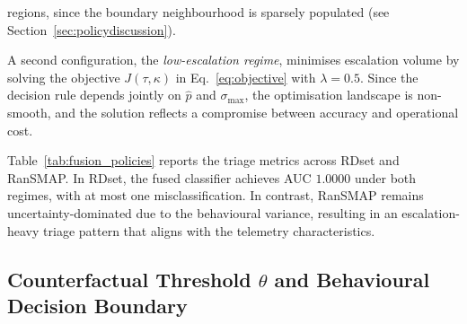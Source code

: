 \documentclass[lettersize,journal]{IEEEtran}
\begin{document}
\cbstart
regions, since the boundary neighbourhood is sparsely populated (see Section~\ref{sec:policydiscussion}).
\cbend


A second configuration, the \emph{low-escalation regime}, minimises escalation volume by
solving the objective $J(\tau,\kappa)$ in Eq.~\eqref{eq:objective} with \(\lambda = 0.5\).
Since the decision rule depends jointly on \(\hat{p}\) and \(\sigma_{\max}\), the optimisation
landscape is non-smooth, and the solution reflects a compromise between accuracy and operational
cost.

Table~\ref{tab:fusion_policies} reports the triage metrics across RDset and RanSMAP. In RDset, the fused classifier achieves AUC \(1.0000\) under both regimes, with at most one misclassification. In contrast, RanSMAP remains uncertainty-dominated due to the behavioural variance, resulting in an escalation-heavy triage pattern that aligns with the telemetry characteristics.

\begin{table}[t]
\centering
{}
\caption{Fusion and triage performance under safety-optimal and low-escalation policies.}
\label{tab:fusion_policies}
\end{table}


\cbstart
\subsection{Counterfactual Threshold $\theta$ and Behavioural Decision Boundary}
\label{subsec:theta}
\cbend
\end{document}
